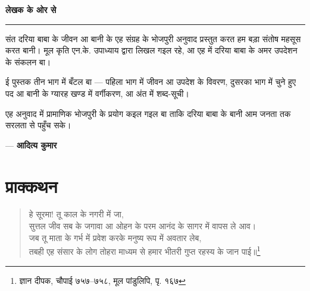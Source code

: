 
\cleardoublepage
\thispagestyle{plain}
\vspace*{\fill}
\begin{center}
  {\Large \bfseries \color{bordercolor} लेखक के ओर से} \\[0.4em]
  {\color{bordercolor}\rule{0.25\textwidth}{0.8pt}}
\end{center}

\vspace{0.8em}
संत दरिया बाबा के जीवन आ बानी के एह संग्रह के भोजपुरी अनुवाद प्रस्तुत करत हम बड़ा संतोष महसूस करत बानी। मूल कृति एन.के. उपाध्याय द्वारा लिखल गइल रहे, आ एह में दरिया बाबा के अमर उपदेशन के संकलन बा।

ई पुस्तक तीन भाग में बँटल बा — पहिला भाग में जीवन आ उपदेश के विवरण, दुसरका भाग में चुने हुए पद आ बानी के ग्यारह खण्ड में वर्गीकरण, आ अंत में शब्द-सूची।

एह अनुवाद में प्रामाणिक भोजपुरी के प्रयोग कइल गइल बा ताकि दरिया बाबा के बानी आम जनता तक सरलता से पहुँच सके।

\begin{flushright}
— {\bfseries आदित्य कुमार}
\end{flushright}
\vspace*{\fill}



\cleardoublepage
\section*{प्राक्कथन}

\begin{quote}
हे सूरमा! तू काल के नगरी में जा,\\
सुत्तल जीव सब के जगावा आ ओहन के परम आनंद के सागर में वापस ले आव।\\
जब तू माता के गर्भ में प्रवेश करके मनुष्य रूप में अवतार लेब,\\
तबही एह संसार के लोग तोहरा माध्यम से हमार भीतरी गुप्त रहस्य के जान पाई॥\footnote{ज्ञान दीपक, चौपाई ७५७--७५८, मूल पांडुलिपि, पृ. १६७}
\end{quote}

